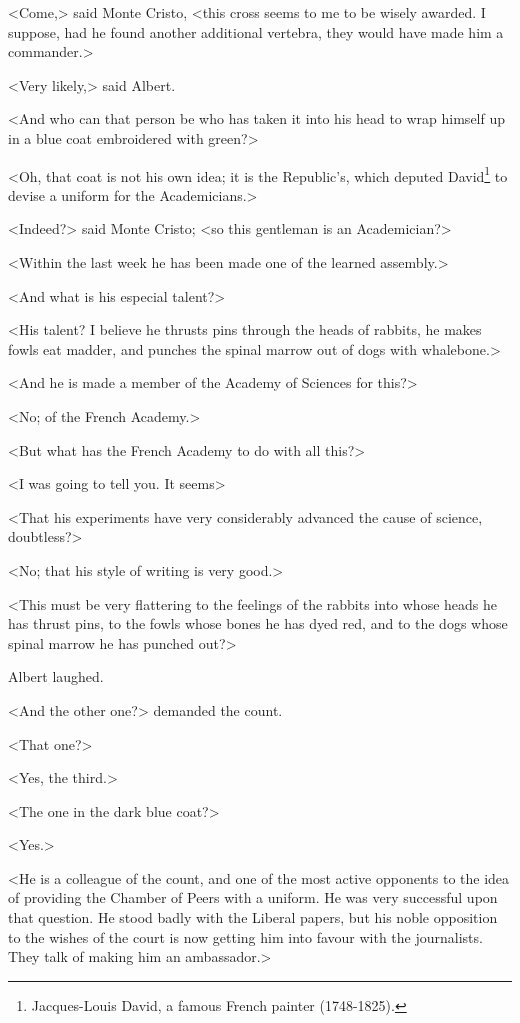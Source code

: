  <Come,> said Monte Cristo, <this cross seems to me to be wisely awarded. I suppose, had he found another additional vertebra, they would have made him a commander.> 

 <Very likely,> said Albert. 

 <And who can that person be who has taken it into his head to wrap himself up in a blue coat embroidered with green?> 

 <Oh, that coat is not his own idea; it is the Republic's, which deputed David\footnote{Jacques-Louis David, a famous French painter (1748-1825). } to devise a uniform for the Academicians.> 

 <Indeed?> said Monte Cristo; <so this gentleman is an Academician?> 

 <Within the last week he has been made one of the learned assembly.> 

 <And what is his especial talent?> 

 <His talent? I believe he thrusts pins through the heads of rabbits, he makes fowls eat madder, and punches the spinal marrow out of dogs with whalebone.> 

 <And he is made a member of the Academy of Sciences for this?> 

 <No; of the French Academy.> 

 <But what has the French Academy to do with all this?> 

 <I was going to tell you. It seems\longdash> 

 <That his experiments have very considerably advanced the cause of science, doubtless?> 

 <No; that his style of writing is very good.> 

 <This must be very flattering to the feelings of the rabbits into whose heads he has thrust pins, to the fowls whose bones he has dyed red, and to the dogs whose spinal marrow he has punched out?> 

 Albert laughed. 

 <And the other one?> demanded the count. 

 <That one?> 

 <Yes, the third.> 

 <The one in the dark blue coat?> 

 <Yes.> 

 <He is a colleague of the count, and one of the most active opponents to the idea of providing the Chamber of Peers with a uniform. He was very successful upon that question. He stood badly with the Liberal papers, but his noble opposition to the wishes of the court is now getting him into favour with the journalists. They talk of making him an ambassador.>

